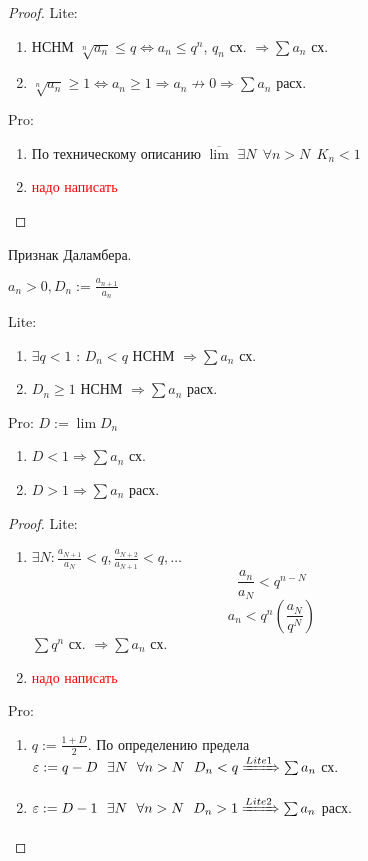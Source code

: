 \begin{proof}
    Lite:
    \begin{enumerate}
        \item НСНМ $\sqrt[n]{a_n} \leq q \Leftrightarrow a_n\leq q^n$, $q_n$ сх. $\Rightarrow \sum a_n$ сх.
        \item $\sqrt[n]{a_n} \geq 1 \Leftrightarrow a_n\geq 1 \Rightarrow a_n\not\to0 \Rightarrow \sum a_n$ расх.
    \end{enumerate}
    Pro:
    \begin{enumerate}
        \item По техническому описанию $\overline \lim$ $\exists N \ \ \forall n > N \ \ K_n<1$
        \item \textcolor{red}{надо написать}
    \end{enumerate}
\end{proof}

\begin{theorem}
    Признак Даламбера.

    $a_n>0, D_n:=\frac{a_{n+1}}{a_n}$

    Lite:
    \begin{enumerate}
        \item $\exists q < 1$ : $D_n < q$ НСНМ $\Rightarrow \sum a_n$ сх.
        \item $D_n\geq 1$ НСНМ $\Rightarrow \sum a_n$ расх.
    \end{enumerate}
    Pro: $D:=\lim D_n$
    \begin{enumerate}
        \item $D < 1 \Rightarrow \sum a_n$ сх.
        \item $D > 1 \Rightarrow \sum a_n$ расх.
    \end{enumerate}
\end{theorem}

\begin{proof}
    Lite:
    \begin{enumerate}
        \item $\exists N : \frac{a_{N+1}}{a_N} < q, \frac{a_{N+2}}{a_{N+1}} < q, \ldots$
        $$\frac{a_n}{a_N} < q^{n-N}$$
        $$a_n < q^n\left(\frac{a_N}{q^N}\right)$$
        $\sum q^n$ сх. $\Rightarrow \sum a_n$ сх.
        \item \textcolor{red}{надо написать}
    \end{enumerate}
    Pro:
    \begin{enumerate}
        \item $q:=\frac{1+D}{2}$. По определению предела $\varepsilon:=q-D \ \ \exists N \ \ \forall n>N \ \ D_n<q \xRightarrow{Lite1} \sum a_n$ сх.
        \item $\varepsilon:=D-1 \ \ \exists N \ \ \forall n > N \ \ D_n>1\xRightarrow{Lite2} \sum a_n$ расх.
    \end{enumerate}
\end{proof}

